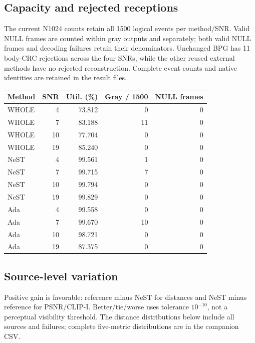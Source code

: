 \documentclass[10pt,letterpaper]{article}
\begin{document}
\subsection{Capacity and rejected receptions}
The current N1024 counts retain all 1500 logical events per method/SNR. Valid NULL frames are counted within gray outputs and separately; both valid NULL frames and decoding failures retain their denominators. Unchanged BPG has 11 body-CRC rejections across the four SNRs, while the other reused external methods have no rejected reconstruction. Complete event counts and native identities are retained in the result files.

\begin{longtable}{@{}lrrrr@{}}\toprule
Method & SNR & Util. (\%) & Gray / 1500 & NULL frames\\\midrule\endhead
WHOLE & 4 & 73.812 & 0 & 0\\
WHOLE & 7 & 83.188 & 11 & 0\\
WHOLE & 10 & 77.704 & 0 & 0\\
WHOLE & 19 & 85.240 & 0 & 0\\
NeST & 4 & 99.561 & 1 & 0\\
NeST & 7 & 99.715 & 7 & 0\\
NeST & 10 & 99.794 & 0 & 0\\
NeST & 19 & 99.829 & 0 & 0\\
Ada & 4 & 99.558 & 0 & 0\\
Ada & 7 & 99.670 & 10 & 0\\
Ada & 10 & 98.721 & 0 & 0\\
Ada & 19 & 87.375 & 0 & 0\\
\bottomrule\end{longtable}
\subsection{Source-level variation}
Positive gain is favorable: reference minus NeST for distances and NeST minus reference for PSNR/CLIP-I. Better/tie/worse uses tolerance $10^{-10}$, not a perceptual visibility threshold. The distance distributions below include all sources and failures; complete five-metric distributions are in the companion CSV.
\end{document}
